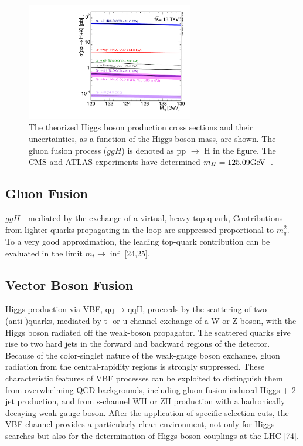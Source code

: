 \begin{figure}[htbp]
\centering
     \includegraphics[width=0.65\textwidth]{phenomology_of_processes/plots/plot_13tev_H_sqrt.pdf}
     \caption{
The theorized Higgs boson production cross sections and their uncertainties,
as a function of the Higgs boson mass, are shown. The gluon fusion process ($ggH$)
is denoted as pp $\to$ H in the figure.
The CMS and ATLAS experiments have determined $m_{H} = 125.09\mathrm{GeV}$~\cite{Aad:2015zhl}.
     }
     \label{fig:higgs_production}
\end{figure}


\subsection{Gluon Fusion}
$ggH$ - mediated by the exchange of a virtual, heavy top quark, Contributions from lighter quarks propagating in the loop are suppressed proportional to $m^{2}_{q}$.
To a very good approximation, the leading top-quark contribution can be evaluated in the limit $m_{t} \to \inf$ [24,25].

\subsection{Vector Boson Fusion}
Higgs production via VBF, qq → qqH, proceeds by the scattering of two (anti-)quarks, mediated by t- or u-channel exchange of a W or Z boson, with the Higgs boson radiated off the weak-boson propagator. The scattered quarks give rise to two hard jets in the forward and backward regions of the detector. Because of the color-singlet nature of the weak-gauge boson exchange, gluon radiation from the central-rapidity regions is strongly suppressed. These characteristic features of VBF processes can be exploited to distinguish them from overwhelming QCD backgrounds, including gluon-fusion induced Higgs + 2 jet production, and from s-channel WH or ZH production with a hadronically decaying weak gauge boson. After the application of specific selection cuts, the VBF channel provides a particularly clean environment, not only for Higgs searches but also for the determination of Higgs boson couplings at the LHC [74].

